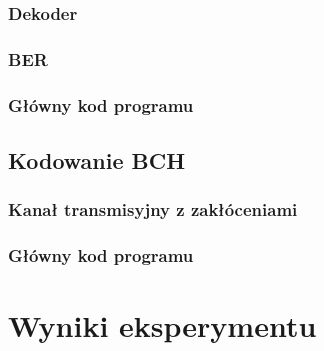 \documentclass[12pt,a4paper,notitlepage]{report}
\begin{document}
    \subsection{Dekoder}
     \hfill \break
    \subsection{BER}
     \break
    \subsection{Główny kod programu}
     \break
    \section{Kodowanie BCH}
    \subsection{Kanał transmisyjny z zakłóceniami}
     \break
    \subsection{Główny kod programu}
     \hfill \break
    \chapter{Wyniki eksperymentu}
\end{document}
